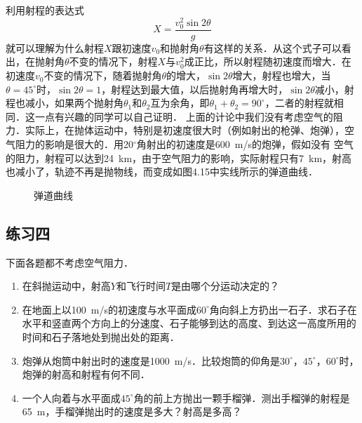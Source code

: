 利用射程的表达式
\[X=\frac{v_0^2\sin 2\theta}{g} \]
就可以理解为什么射程$X$跟初速度$v_0$和抛射角$\theta$有这样的关系．从这个式子可以看出，在抛射角$\theta$不变的情况下，射程$X$与$v^2_0$成正比，所以射程随初速度而增大．在初速度$v_0$不变的情况下，随着抛射角$\theta$的增大，$\sin 2\theta$增大，射程也增大，当$\theta=45^{\circ}$时，$\sin 2\theta=1$，射程达到最大值，以后抛射角再增大时，$\sin 2\theta$减小，射程也减小，如果两个抛射角$\theta_1$和$\theta_2$互为余角，即$\theta_1+\theta_2=90^\circ$，二者的射程就相同．这一点有兴趣的同学可以自己证明．
\newpage
上面的计论中我们没有考虑空气的阻力．实际上，在抛体运动中，特别是初速度很大时（例如射出的枪弹、炮弹），空气阻力的影响是很大的．用20$^\circ$角射出的初速度是\SI{600}{m/s}的炮弹，假如没有 空气的阻力，射程可以达到\SI{24}{km}，由于空气阻力的影响，实际射程只有\SI{7}{km}，射高也减小了，轨迹不再是抛物线，而变成如图4.15中实线所示的弹道曲线．
\begin{figure}[H]
    \centering
    \caption{弹道曲线}
\end{figure}

\subsection*{练习四}
下面各题都不考虑空气阻力．
\begin{enumerate}
    \item 在斜抛运动中，射高$Y$和飞行时间$T$是由哪个分运动决定的？
    \item 在地面上以\SI{100}{m/s}的初速度与水平面成$60^\circ$角向斜上方扔出一石子．求石子在水平和竖直两个方向上的分速度、石子能够到达的高度、到达这一高度所用的时间和石子落地处到抛出处的距离．
    \item 炮弹从炮筒中射出时的速度是\SI{1000}{m/s}．比较炮筒的仰角是$30^\circ$，$45^\circ$，$60^\circ$时，炮弹的射高和射程有何不同．
    \item 一个人向着与水平面成$45^\circ$角的前上方抛出一颗手榴弹．测出手榴弹的射程是\SI{65}{m}，手榴弹抛出时的速度是多大？射高是多高？
\end{enumerate}
\newpage
